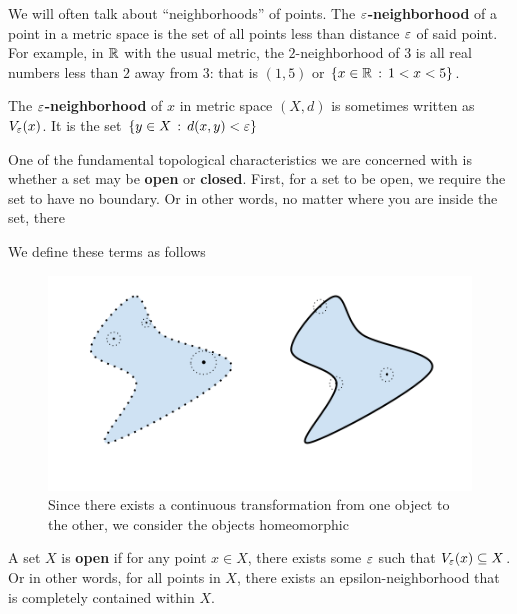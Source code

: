 We will often talk about ``neighborhoods'' of points. The \textbf{$\e$-neighborhood} of a point in a metric space is the set of all points less than distance $\e$ of said point. For example, in $\mathbb{R}$ with the usual metric, the $2$-neighborhood of $3$ is all real numbers less than $2$ away from $3$: that is $(1,5)$ or $\{x\in\mathbb{R}\, :\, 1<x<5\}$. 

\begin{definition}[$\e$-neighborhood]
    The \textbf{$\e$-neighborhood} of $x$ in metric space $(X,d)$ is sometimes written as $V_\varepsilon(x)$. It is the set $\{y\in X \, :\, d(x,y)<\varepsilon\}$
\end{definition}

One of the fundamental topological characteristics we are concerned with is whether a set may be \textbf{open} or \textbf{closed}. First, for a set to be open, we require the set to have no boundary. Or in other words, no matter where you are inside the set, there

We define these terms as follows

\begin{figure}
    \includegraphics[width=0.9\linewidth]{Images/Chap0/0.4.2.png}
    \caption{Since there exists a continuous transformation from one object to the other, we consider the objects homeomorphic}
    \label{fig:donut-coffee}
\end{figure}

\begin{definition}
A set $X$ is \textbf{open} if for any point $x\in X$, there exists some $\e$ such that $V_\varepsilon(x)\subseteq X$. Or in other words, for all points in $X$, there exists an epsilon-neighborhood that is completely contained within $X$.     
\end{definition}





